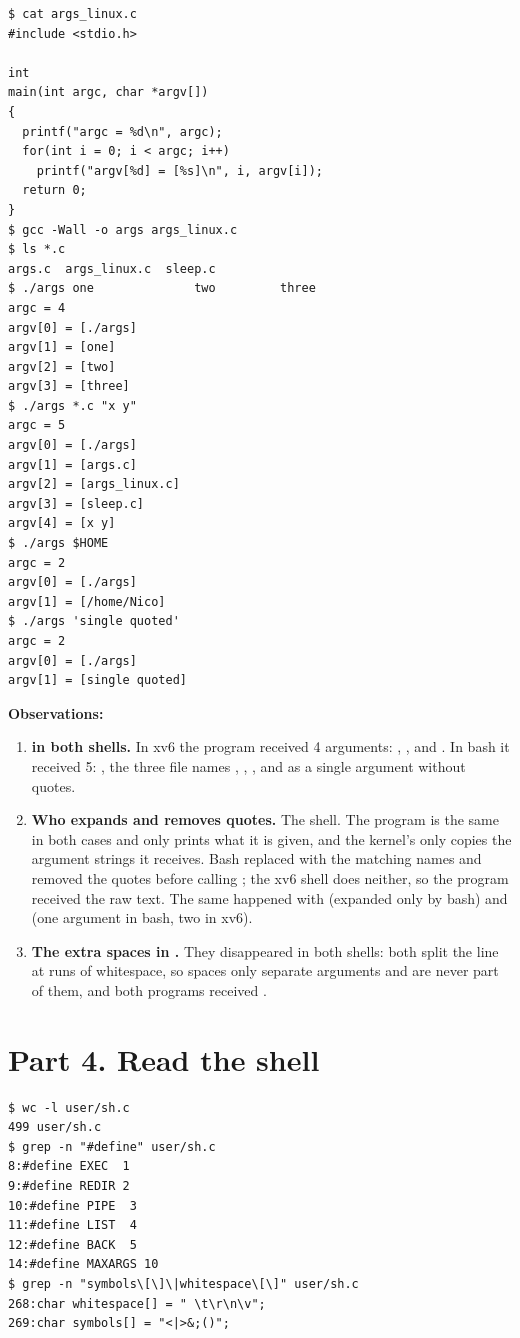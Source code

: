 \documentclass[11pt,a4paper]{article}
\begin{document}
\begin{lstlisting}[caption={args\_linux output in bash}]
$ cat args_linux.c
#include <stdio.h>

int
main(int argc, char *argv[])
{
  printf("argc = %d\n", argc);
  for(int i = 0; i < argc; i++)
    printf("argv[%d] = [%s]\n", i, argv[i]);
  return 0;
}
$ gcc -Wall -o args args_linux.c
$ ls *.c
args.c  args_linux.c  sleep.c
$ ./args one              two         three
argc = 4
argv[0] = [./args]
argv[1] = [one]
argv[2] = [two]
argv[3] = [three]
$ ./args *.c "x y"
argc = 5
argv[0] = [./args]
argv[1] = [args.c]
argv[2] = [args_linux.c]
argv[3] = [sleep.c]
argv[4] = [x y]
$ ./args $HOME
argc = 2
argv[0] = [./args]
argv[1] = [/home/Nico]
$ ./args 'single quoted'
argc = 2
argv[0] = [./args]
argv[1] = [single quoted]
\end{lstlisting}

\textbf{Observations:}
\begin{enumerate}
  \item \textbf{ in both shells.} In xv6 the program received 4 arguments:
  , ,  and . In bash it received 5: , the
  three file names , , , and  as a
  single argument without quotes.
  \item \textbf{Who expands \code{*} and removes quotes.} The shell. The program is the same in
  both cases and only prints what it is given, and the kernel's  only copies the
  argument strings it receives. Bash replaced  with the matching names and removed the
  quotes before calling ; the xv6 shell does neither, so the program received the
  raw text. The same happened with  (expanded only by bash) and
   (one argument in bash, two in xv6).
  \item \textbf{The extra spaces in .} They disappeared in both shells:
  both split the line at runs of whitespace, so spaces only separate arguments and are never
  part of them, and both programs received .
\end{enumerate}

\section{Part 4. Read the shell}

\begin{lstlisting}[caption={The command kinds defined in sh.c}]
$ wc -l user/sh.c
499 user/sh.c
$ grep -n "#define" user/sh.c
8:#define EXEC  1
9:#define REDIR 2
10:#define PIPE  3
11:#define LIST  4
12:#define BACK  5
14:#define MAXARGS 10
$ grep -n "symbols\[\]\|whitespace\[\]" user/sh.c
268:char whitespace[] = " \t\r\n\v";
269:char symbols[] = "<|>&;()";
\end{lstlisting}
\end{document}
